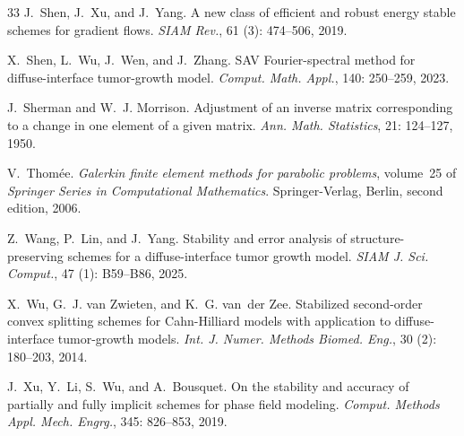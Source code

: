 \documentclass[11pt, reqno]{amsart}
\theoremstyle{definition}
\numberwithin{equation}{section}
\begin{document}
\begin{thebibliography}{33}
	J.~Shen, J.~Xu, and J.~Yang.
	\newblock A new class of efficient and robust energy stable schemes for
	gradient flows.
	\newblock \emph{SIAM Rev.}, 61 (3): 474--506, 2019.
	
	X.~Shen, L.~Wu, J.~Wen, and J.~Zhang.
	\newblock S{AV} {F}ourier-spectral method for diffuse-interface tumor-growth
	model.
	\newblock \emph{Comput. Math. Appl.}, 140: 250--259, 2023.
	
	J.~Sherman and W.~J. Morrison.
	\newblock Adjustment of an inverse matrix corresponding to a change in one
	element of a given matrix.
	\newblock \emph{Ann. Math. Statistics}, 21: 124--127, 1950.
	
	V.~Thom\'ee.
	\newblock \emph{Galerkin finite element methods for parabolic problems},
	volume~25 of \emph{Springer Series in Computational Mathematics}.
	\newblock Springer-Verlag, Berlin, second edition, 2006.
	
	Z.~Wang, P.~Lin, and J.~Yang.
	\newblock Stability and error analysis of structure-preserving schemes for a
	diffuse-interface tumor growth model.
	\newblock \emph{SIAM J. Sci. Comput.}, 47 (1): B59--B86,
	2025.
	
	X.~Wu, G.~J. van Zwieten, and K.~G. van~der Zee.
	\newblock Stabilized second-order convex splitting schemes for
	{C}ahn-{H}illiard models with application to diffuse-interface tumor-growth
	models.
	\newblock \emph{Int. J. Numer. Methods Biomed. Eng.}, 30 (2):
	180--203, 2014.
	
	J.~Xu, Y.~Li, S.~Wu, and A.~Bousquet.
	\newblock On the stability and accuracy of partially and fully implicit schemes
	for phase field modeling.
	\newblock \emph{Comput. Methods Appl. Mech. Engrg.}, 345: 826--853,
	2019.
	
\end{thebibliography}
\end{document}
